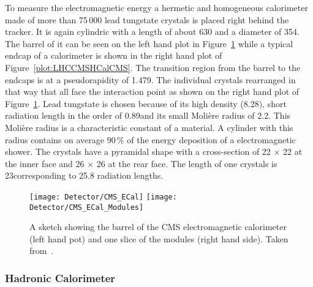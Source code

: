 To measure the electromagnetic energy a hermetic and homogeneous calorimeter made of more than 75\,000 lead tungstate crystals is placed right behind the tracker. It is again cylindric with a length of about 630\cm{} and a diameter of 354\cm. The barrel of it can be seen on the left hand plot in Figure~\ref{plot:LHCCMSECalCMS} while a typical endcap of a calorimeter is shown in the right hand plot of Figure~\ref{plot:LHCCMSHCalCMS}. The transition region from the barrel to the endcaps is at a pseudorapidity of 1.479. The individual crystals rearranged in that way that all face the interaction point as shown on the right hand plot of Figure~\ref{plot:LHCCMSECalCMS}. Lead tungstate is chosen because of its high density (8.28\gcmc{}), short radiation length in the order of 0.89\cm and its small Moli\`ere radius of 2.2\cm{}. This Moli\`ere radius is a characteristic constant of a material. A cylinder with this radius contains on average $90\,\%$ of the energy deposition of a electromagnetic shower. The crystals have a pyramidal shape with a cross-section of 22 $\times{}$ 22\mms{} at the inner face and 26 $\times{}$ 26\mms{} at the rear face. The length of one crystals is 23\cm corresponding to 25.8 radiation lengths.

\begin{figure}[!Hhtb]
  \centering
  \texttt{[image: Detector/CMS\_ECal]}
  \texttt{[image: Detector/CMS\_ECal\_Modules]}
  \caption[Sketches of the electromagnetic calorimeter of CMS]{A sketch showing the barrel of the CMS electromagnetic calorimeter (left hand pot) and one slice of the modules (right hand side). Taken from~. \label{plot:LHCCMSECalCMS}}
\end{figure}

\subsubsection{Hadronic Calorimeter}

